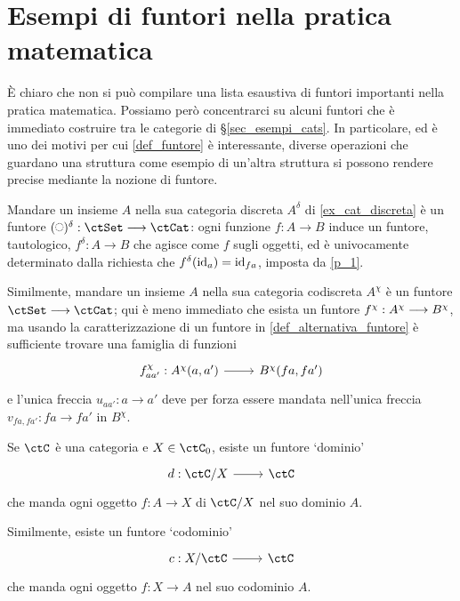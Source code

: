 \section{Esempi di funtori nella pratica matematica}\label{sec_esempi_funtori}
\`E chiaro che non si può compilare una lista esaustiva di funtori importanti nella pratica matematica. Possiamo però concentrarci su alcuni funtori che è immediato costruire tra le categorie di §\ref{sec_esempi_cats}. In particolare, ed è uno dei motivi per cui \ref{def_funtore} è interessante, diverse operazioni che guardano una struttura come esempio di un'altra struttura si possono rendere precise mediante la nozione di funtore.
\begin{example}\label{ex_fun_co_disc}
	Mandare un insieme \(A\) nella sua categoria discreta \(A^\delta\) di \ref{ex_cat_discreta} è un funtore \((\blank)^\delta : \ctSet \fun \ctCat\): ogni funzione \(f : A \to B\) induce un funtore, tautologico, \(f^\delta : A \to B\) che agisce come \(f\) sugli oggetti, ed è univocamente determinato dalla richiesta che \(f^\delta(\mathrm{id}_a) = \mathrm{id}_{fa}\), imposta da \ref{p_1}.

	Similmente, mandare un insieme \(A\) nella sua categoria codiscreta \(A^\chi\) è un funtore \(\ctSet \fun\ctCat\); qui è meno immediato che esista un funtore \(f^\chi : A^\chi\longrightarrow B^\chi\), ma usando la caratterizzazione di un funtore in \ref{def_alternativa_funtore} è sufficiente trovare una famiglia di funzioni
	\[\begin{tikzcd}
			f^\chi_{aa'} : \Hom{A^\chi}(a,a') \ar[r] & \Hom{B^\chi}(fa, fa')
		\end{tikzcd}\]
	e l'unica freccia \(u_{aa'} : a\to a'\) deve per forza essere mandata nell'unica freccia \(v_{fa,fa'} : fa \to fa'\) in \(B^\chi\).
\end{example}
\begin{example}\label{dom_e_cod}
	Se \(\ctC\) è una categoria e \(X\in\ctC_0\), esiste un funtore `dominio'
	\[\dmFun{d}{\ctC/X}{\ctC}\]
	che manda ogni oggetto \(f : A\to X\) di \(\ctC/X\) nel suo dominio \(A\).

	Similmente, esiste un funtore `codominio'
	\[\dmFun{c}{X/\ctC}{\ctC}\]
	che manda ogni oggetto \(f : X\to A\) nel suo codominio \(A\).
\end{example}
